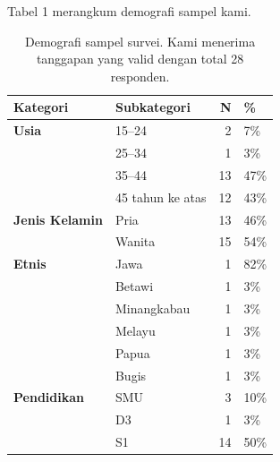 \documentclass[lettersize,journal]{IEEEtran}
\begin{document}
Tabel 1 merangkum demografi sampel kami.

\begin{table}[h!]
  \centering
  \caption{Demografi sampel survei. Kami menerima tanggapan yang valid dengan total 28 responden.}
  \begin{tabular}{@{}llrl@{}}
    \toprule
    \textbf{Kategori}                              & \textbf{Subkategori} & \textbf{N} & \textbf{\%} \\ \midrule
    \textbf{Usia}                                  & 15--24               & 2          & 7\%         \\
                                                   & 25--34               & 1          & 3\%         \\
                                                   & 35--44               & 13         & 47\%        \\
                                                   & 45 tahun ke atas     & 12         & 43\%        \\ \midrule
    \textbf{Jenis Kelamin}                         & Pria                 & 13         & 46\%        \\
                                                   & Wanita               & 15         & 54\%        \\   \midrule
    \textbf{Etnis}                                 & Jawa                 & 1          & 82\%        \\
                                                   & Betawi               & 1          & 3\%         \\
                                                   & Minangkabau          & 1          & 3\%         \\
                                                   & Melayu               & 1          & 3\%         \\
                                                   & Papua                & 1          & 3\%         \\
                                                   & Bugis                & 1          & 3\%         \\ \midrule
    \textbf{Pendidikan}                            & SMU                  & 3          & 10\%        \\
                                                   & D3                   & 1          & 3\%         \\
                                                   & S1                   & 14         & 50\%        \\

\end{tabular}
\end{table}
\end{document}
